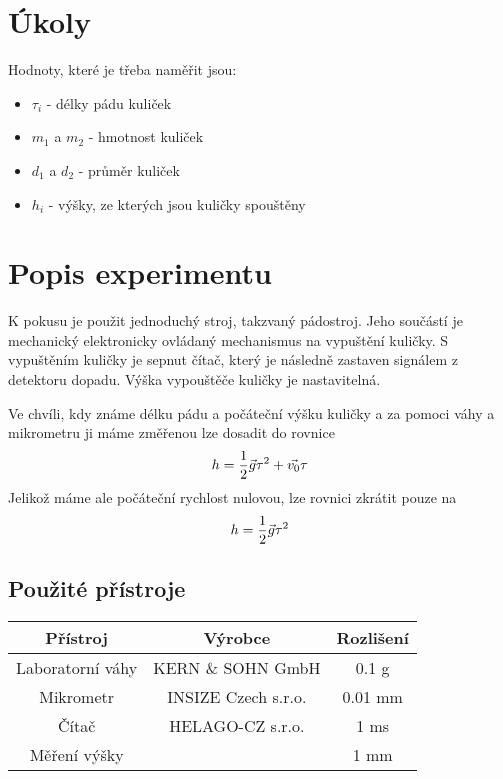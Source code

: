 \documentclass[titlepage]{article}
\begin{document}
	\section{Úkoly}
		Hodnoty, které je třeba naměřit jsou:
		\begin{itemize}
			\item $\tau_i$ - délky pádu kuliček
			\item $m_1$ a $m_2$ - hmotnost kuliček
			\item $d_1$ a $d_2$ - průměr kuliček
			\item $h_i$ - výšky, ze kterých jsou kuličky spouštěny
		\end{itemize}
	\section{Popis experimentu}
		K pokusu je použit jednoduchý stroj, takzvaný pádostroj. Jeho součástí je mechanický elektronicky ovládaný mechanismus na vypuštění kuličky. S vypuštěním kuličky je sepnut čítač, který je následně zastaven signálem z detektoru dopadu. Výška vypouštěče kuličky je nastavitelná.
	
		Ve chvíli, kdy známe délku pádu a počáteční výšku kuličky a za pomoci váhy a mikrometru ji máme změřenou lze dosadit do rovnice
		\begin{equation}
			h = {1 \over 2}\vec{g}\tau^2+\vec{v_0}\tau
		\end{equation}
		Jelikož máme ale počáteční rychlost nulovou, lze rovnici zkrátit pouze na
		\begin{equation}
			h = {1 \over 2}\vec{g}\tau^2
		\end{equation}
		\newpage
		\subsection{Použité přístroje}
		\begin{table}[!h]
			\begin{tabular}{|c|c|c|}
			\hline
			\textbf{Přístroj} & \textbf{Výrobce} & \textbf{Rozlišení}\\
			\hline
			\hline
			Laboratorní váhy & KERN \& SOHN GmbH & 0.1 g\\
			\hline
			Mikrometr & INSIZE Czech s.r.o. & 0.01 mm\\
			\hline
			Čítač & HELAGO-CZ s.r.o. & 1 ms\\
			\hline
			Měření výšky &  & 1 mm\\
			\hline
			\end{tabular}
		\end{table}
\end{document}
